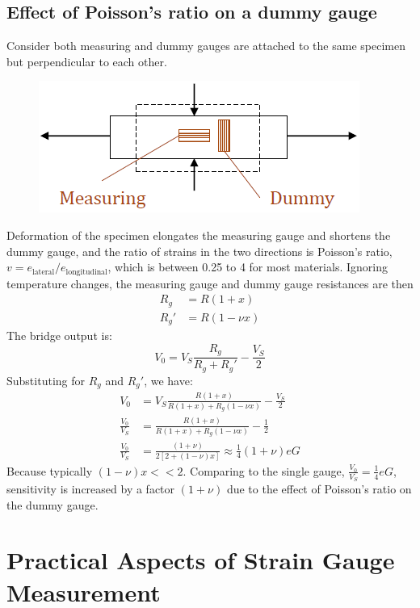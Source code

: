 \documentclass[class=report, crop=false, 12pt,a4paper]{standalone}
\begin{document}
\subsection{Effect of Poisson's ratio on a dummy gauge}
Consider both measuring and dummy gauges are attached to the same specimen but perpendicular to each other.
\begin{figure}[H]
  \centering
  \includegraphics[width = 0.6 \textwidth]{../img/diagram14.png}
\end{figure}
Deformation of the specimen elongates the measuring gauge and shortens the dummy gauge, and the ratio of strains in the two directions is Poisson's ratio, $v = e_{\textrm{lateral}}/e_{\textrm{longitudinal}}$, which is between 0.25 to 4 for most materials. Ignoring temperature changes, the measuring gauge and dummy gauge resistances are then \begin{align}
  R_g &= R(1+x)\\
  R_g' &= R(1-\nu x)
\end{align}
The bridge output is: 
\begin{equation}
  V_0 = V_S\frac{R_g}{R_g + R_g'} - \frac{V_S}{2}
\end{equation}
Substituting for $R_g$ and $R_g'$, we have:
\begin{align}
  V_0 &= V_S \frac{R(1+x)}{R(1+x) + R_g(1-\nu x)} - \frac{V_S}{2}\\
  \frac{V_0}{V_S} &= \frac{R(1+x)}{R(1+x) + R_g(1-\nu x)} - \frac{1}{2}\\
  \frac{V_0}{V_S} &= \frac{(1+ \nu)}{2[2+ (1-\nu)x]} \approx \frac{1}{4} (1+\nu) eG
\end{align}
Because typically $(1-\nu) x << 2$. Comparing to the single gauge, $\frac{V_0}{V_S} = \frac{1}{4}eG$, sensitivity is increased by a factor $(1+\nu)$ due to the effect of Poisson's ratio on the dummy gauge.
\section{Practical Aspects of Strain Gauge Measurement}
\end{document}
